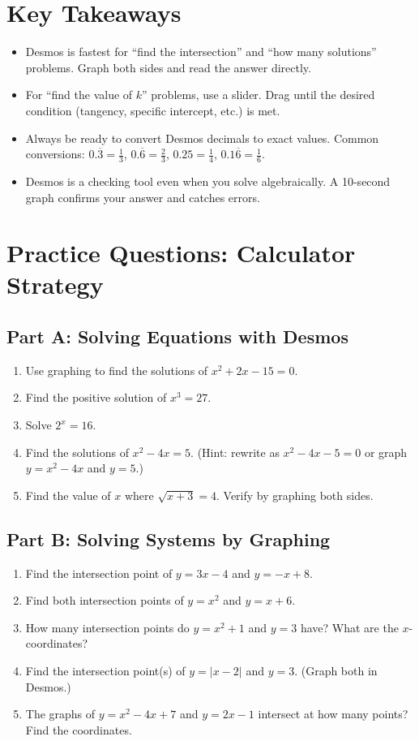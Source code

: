 \documentclass[14pt]{extarticle}
\begin{document}
\section*{Key Takeaways}
\begin{itemize}
  \item Desmos is fastest for ``find the intersection'' and ``how many solutions'' problems. Graph both sides and read the answer directly.
  \item For ``find the value of \(k\)'' problems, use a slider. Drag until the desired condition (tangency, specific intercept, etc.) is met.
  \item Always be ready to convert Desmos decimals to exact values. Common conversions: \(0.\overline{3} = \frac{1}{3}\), \(0.\overline{6} = \frac{2}{3}\), \(0.25 = \frac{1}{4}\), \(0.1\overline{6} = \frac{1}{6}\).
  \item Desmos is a checking tool even when you solve algebraically. A 10-second graph confirms your answer and catches errors.
\end{itemize}

\newpage

\section*{Practice Questions: Calculator Strategy}

\subsection*{Part A: Solving Equations with Desmos}
\begin{enumerate}
  \item Use graphing to find the solutions of \(x^2 + 2x - 15 = 0\).
  \item Find the positive solution of \(x^3 = 27\).
  \item Solve \(2^x = 16\).
  \item Find the solutions of \(x^2 - 4x = 5\). (Hint: rewrite as \(x^2 - 4x - 5 = 0\) or graph \(y = x^2 - 4x\) and \(y = 5\).)
  \item Find the value of \(x\) where \(\sqrt{x + 3} = 4\). Verify by graphing both sides.
\end{enumerate}

\subsection*{Part B: Solving Systems by Graphing}
\begin{enumerate}
  \item Find the intersection point of \(y = 3x - 4\) and \(y = -x + 8\).
  \item Find both intersection points of \(y = x^2\) and \(y = x + 6\).
  \item How many intersection points do \(y = x^2 + 1\) and \(y = 3\) have? What are the \(x\)-coordinates?
  \item Find the intersection point(s) of \(y = |x - 2|\) and \(y = 3\). (Graph both in Desmos.)
  \item The graphs of \(y = x^2 - 4x + 7\) and \(y = 2x - 1\) intersect at how many points? Find the coordinates.
\end{enumerate}
\end{document}
